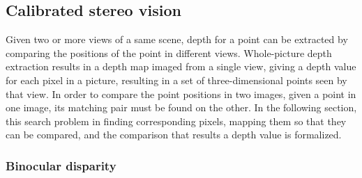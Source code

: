 

\subsection{Calibrated stereo vision} %

Given two or more views of a same scene, depth for a point can be extracted by comparing the positions of the point in different views.
Whole-picture depth extraction results in a depth map imaged from a single view, giving a depth value for each pixel in a picture, resulting in a set of three-dimensional points seen by that view.
In order to compare the point positions in two images, given a point in one image, its matching pair must be found on the other.
In the following section, this search problem in finding corresponding pixels, mapping them so that they can be compared, and the comparison that results a depth value is formalized.


\subsubsection{Binocular disparity} \label{sec:binocular} %



